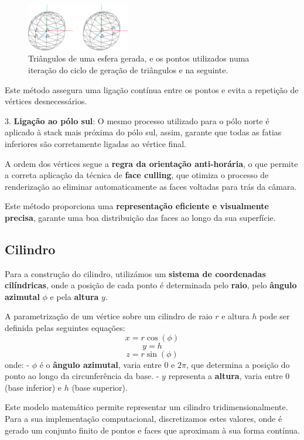 \documentclass[12pt, a4paper]{article}
\begin{document}
\begin{figure}[H]
    \centering
    \includegraphics[width=0.4\textwidth]{res/figures/sphere.pdf}
    \caption{
        Triângulos de uma esfera gerada, e os pontos utilizados numa iteração do ciclo de geração
        de triângulos e na seguinte.
    }
\end{figure}

Este método assegura uma ligação contínua entre os pontos e evita a repetição de vértices
desnecessários.

3. \textbf{Ligação ao pólo sul}: O mesmo processo utilizado para o pólo norte é aplicado à stack
mais próxima do pólo sul, assim, garante que todas as fatias inferiores são corretamente ligadas ao
vértice final.

A ordem dos vértices segue a \textbf{regra da orientação anti-horária}, o que permite a correta
aplicação da técnica de \textbf{face culling}, que otimiza o processo de renderização ao eliminar
automaticamente as faces voltadas para trás da câmara.

Este método proporciona uma \textbf{representação eficiente e visualmente precisa}, garante uma
boa distribuição das faces ao longo da sua superfície.

\subsection{Cilindro}

Para a construção do cilindro, utilizámos um \textbf{sistema de coordenadas cilíndricas}, onde a
posição de cada ponto é determinada pelo \textbf{raio}, pelo \textbf{ângulo azimutal} \( \phi \) e
pela \textbf{altura} \( y \).

A parametrização de um vértice sobre um cilindro de raio \( r \) e altura \( h \) pode ser definida
pelas seguintes equações:
\[
x = r \cos(\phi)
\]
\[
y = h
\]
\[
z = r \sin(\phi)
\]
onde:
- \( \phi \) é o \textbf{ângulo azimutal}, varia entre \( 0 \) e \( 2\pi \), que determina a
posição do ponto ao longo da circunferência da base.
- \( y \) representa a \textbf{altura}, varia entre \( 0 \) (base inferior) e \( h \)
(base superior).

Este modelo matemático permite representar um cilindro tridimensionalmente. Para a sua implementação
computacional, discretizamos estes valores, onde é gerado um conjunto finito de pontos e faces que
aproximam à sua forma contínua.
\end{document}
